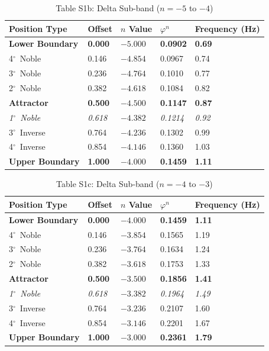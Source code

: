 \documentclass[11pt,a4paper]{article}
\newcommand{\degree}{$^\circ$}  %
\newcommand{\phisym}{\varphi}
\begin{document}
\begin{table}[H]
\centering
\caption*{Table S1b: Delta Sub-band ($n = -5$ to $-4$)}
\begin{tabular}{@{}lllll@{}}
\toprule
Position Type & Offset & $n$ Value & $\phisym^n$ & Frequency (Hz) \\
\midrule
\textbf{Lower Boundary} & \textbf{0.000} & $\mathbf{-5.000}$ & \textbf{0.0902} & \textbf{0.69} \\
4\degree\ Noble & 0.146 & $-4.854$ & 0.0967 & 0.74 \\
3\degree\ Noble & 0.236 & $-4.764$ & 0.1010 & 0.77 \\
2\degree\ Noble & 0.382 & $-4.618$ & 0.1084 & 0.82 \\
\textbf{Attractor} & \textbf{0.500} & $\mathbf{-4.500}$ & \textbf{0.1147} & \textbf{0.87} \\
\textit{1\degree\ Noble} & \textit{0.618} & $-4.382$ & \textit{0.1214} & \textit{0.92} \\
3\degree\ Inverse & 0.764 & $-4.236$ & 0.1302 & 0.99 \\
4\degree\ Inverse & 0.854 & $-4.146$ & 0.1360 & 1.03 \\
\textbf{Upper Boundary} & \textbf{1.000} & $\mathbf{-4.000}$ & \textbf{0.1459} & \textbf{1.11} \\
\bottomrule
\end{tabular}
\end{table}

\begin{table}[H]
\centering
\caption*{Table S1c: Delta Sub-band ($n = -4$ to $-3$)}
\begin{tabular}{@{}lllll@{}}
\toprule
Position Type & Offset & $n$ Value & $\phisym^n$ & Frequency (Hz) \\
\midrule
\textbf{Lower Boundary} & \textbf{0.000} & $\mathbf{-4.000}$ & \textbf{0.1459} & \textbf{1.11} \\
4\degree\ Noble & 0.146 & $-3.854$ & 0.1565 & 1.19 \\
3\degree\ Noble & 0.236 & $-3.764$ & 0.1634 & 1.24 \\
2\degree\ Noble & 0.382 & $-3.618$ & 0.1753 & 1.33 \\
\textbf{Attractor} & \textbf{0.500} & $\mathbf{-3.500}$ & \textbf{0.1856} & \textbf{1.41} \\
\textit{1\degree\ Noble} & \textit{0.618} & $-3.382$ & \textit{0.1964} & \textit{1.49} \\
3\degree\ Inverse & 0.764 & $-3.236$ & 0.2107 & 1.60 \\
4\degree\ Inverse & 0.854 & $-3.146$ & 0.2201 & 1.67 \\
\textbf{Upper Boundary} & \textbf{1.000} & $\mathbf{-3.000}$ & \textbf{0.2361} & \textbf{1.79} \\
\bottomrule
\end{tabular}
\end{table}
\end{document}
